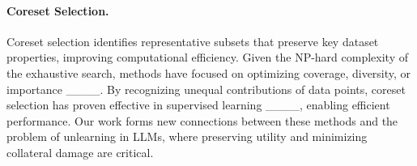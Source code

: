 \paragraph{Coreset Selection.} Coreset selection identifies representative subsets that preserve key dataset properties, improving computational efficiency. Given the NP-hard complexity of the exhaustive search, methods have focused on optimizing coverage, diversity, or importance ____. By recognizing unequal contributions of data points, coreset selection has proven effective in supervised learning ____, enabling efficient performance. 
Our work forms new connections between these methods and the problem of unlearning in LLMs, where preserving utility and minimizing collateral damage are critical.
